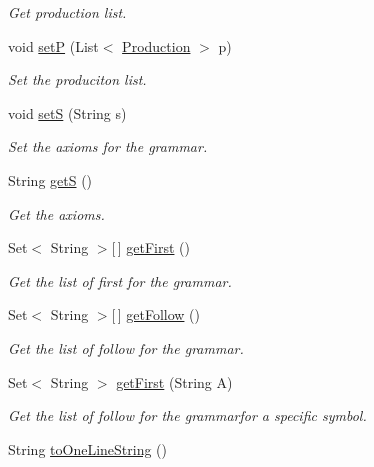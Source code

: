 \begin{DoxyCompactItemize}
\begin{DoxyCompactList}\small\item\em Get production list. \end{DoxyCompactList}\item 
void \hyperlink{interfacecontext_free_1_1grammar_1_1_i_grammar_ac070229e5571e47032b5199c0bf2c354}{set\-P} (List$<$ \hyperlink{classcontext_free_1_1grammar_1_1_production}{Production} $>$ p)
\begin{DoxyCompactList}\small\item\em Set the produciton list. \end{DoxyCompactList}\item 
void \hyperlink{interfacecontext_free_1_1grammar_1_1_i_grammar_a134f8b2183ec804eff78ac57b16a0ab9}{set\-S} (String s)
\begin{DoxyCompactList}\small\item\em Set the axioms for the grammar. \end{DoxyCompactList}\item 
String \hyperlink{interfacecontext_free_1_1grammar_1_1_i_grammar_aceb36e584d26bd39a0f5186742cc9b5b}{get\-S} ()
\begin{DoxyCompactList}\small\item\em Get the axioms. \end{DoxyCompactList}\item 
Set$<$ String $>$\mbox{[}$\,$\mbox{]} \hyperlink{interfacecontext_free_1_1grammar_1_1_i_grammar_a256e9280e008a7c709ccb80725ccc0f2}{get\-First} ()
\begin{DoxyCompactList}\small\item\em Get the list of first for the grammar. \end{DoxyCompactList}\item 
Set$<$ String $>$\mbox{[}$\,$\mbox{]} \hyperlink{interfacecontext_free_1_1grammar_1_1_i_grammar_aad085d9f84a32ca1abe5fba0c9e5f20c}{get\-Follow} ()
\begin{DoxyCompactList}\small\item\em Get the list of follow for the grammar. \end{DoxyCompactList}\item 
Set$<$ String $>$ \hyperlink{interfacecontext_free_1_1grammar_1_1_i_grammar_a7a05f11e88cdbe29db1849541592e272}{get\-First} (String A)
\begin{DoxyCompactList}\small\item\em Get the list of follow for the grammarfor a specific symbol. \end{DoxyCompactList}\item 
String \hyperlink{interfacecontext_free_1_1grammar_1_1_i_grammar_a5fdeb5a6a9426b400c2fe805566a377c}{to\-One\-Line\-String} ()
\end{DoxyCompactItemize}


